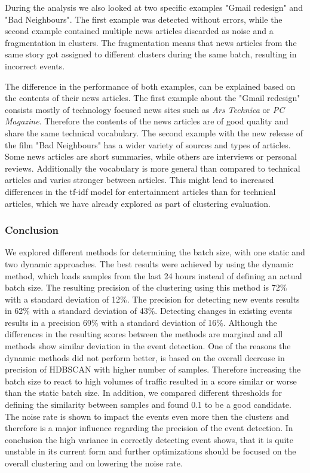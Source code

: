 During the analysis we also looked at two specific examples "Gmail redesign" and "Bad Neighbours".
The first example was detected without errors,
while the second example contained multiple news articles discarded as noise and a fragmentation in clusters.
The fragmentation means that news articles from the same story got assigned to different clusters during the same batch,
resulting in incorrect events.

The difference in the performance of both examples, can be explained based on the contents of their news articles.
The first example about the "Gmail redesign" consists mostly of technology focused news sites
such as \textit{Ars Technica} or \textit{PC Magazine}.
Therefore the contents of the news articles are of good quality and share the same technical vocabulary.
The second example with the new release of the film "Bad Neighbours"
has a wider variety of sources and types of articles.
Some news articles are short summaries, while others are interviews or personal reviews.
Additionally the vocabulary is more general than compared to technical articles and varies stronger between articles.
This might lead to increased differences in the tf-idf model for entertainment articles than for technical articles,
which we have already explored as part of clustering evaluation.

\subsubsection{Conclusion}
\label{subsubsec:5b_conclusion}

We explored different methods for determining the batch size, with one static and two dynamic approaches.
The best results were achieved by using the dynamic method,
which loads samples from the last 24 hours instead of defining an actual batch size.
The resulting precision of the clustering using this method is 72\% with a standard deviation of 12\%.
The precision for detecting new events results in 62\% with a standard deviation of 43\%.
Detecting changes in existing events results in a precision 69\% with a standard deviation of 16\%.
Although the differences in the resulting scores between the methods are marginal
and all methods show similar deviation in the event detection.
One of the reasons the dynamic methods did not perform better,
is based on the overall decrease in precision of HDBSCAN with higher number of samples.
Therefore increasing the batch size to react to high volumes of traffic
resulted in a score similar or worse than the static batch size.
In addition, we compared different thresholds for defining the similarity between samples
and found 0.1 to be a good candidate.
The noise rate is shown to impact the events even more then the clusters
and therefore is a major influence regarding the precision of the event detection.
In conclusion the high variance in correctly detecting event shows,
that it is quite unstable in its current form and further optimizations should be focused
on the overall clustering and on lowering the noise rate.
